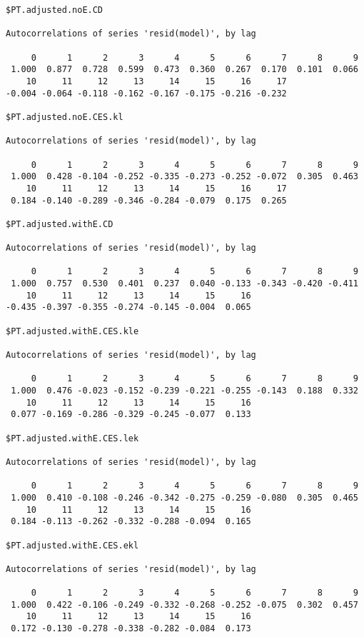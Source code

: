 \documentclass[preprint,authoryear,12pt]{elsarticle}\usepackage[]{graphicx}\usepackage[]{color}
\makeatletter
\newenvironment{kframe}{%
 \def\at@end@of@kframe{}%
 \ifinner\ifhmode%
  \def\at@end@of@kframe{\end{minipage}}%
  \begin{minipage}{\columnwidth}%
 \fi\fi%
 \def\FrameCommand##1{\hskip\@totalleftmargin \hskip-\fboxsep
 \colorbox{shadecolor}{##1}\hskip-\fboxsep
     \hskip-\linewidth \hskip-\@totalleftmargin \hskip\columnwidth}%
 \MakeFramed {\advance\hsize-\width
   \@totalleftmargin\z@ \linewidth\hsize
   \@setminipage}}%
 {\par\unskip\endMakeFramed%
 \at@end@of@kframe}
\newenvironment{knitrout}{}{} %
\makeatother
\begin{document}
\begin{knitrout}
\begin{kframe}
\begin{verbatim}
$PT.adjusted.noE.CD

Autocorrelations of series 'resid(model)', by lag

     0      1      2      3      4      5      6      7      8      9 
 1.000  0.877  0.728  0.599  0.473  0.360  0.267  0.170  0.101  0.066 
    10     11     12     13     14     15     16     17 
-0.004 -0.064 -0.118 -0.162 -0.167 -0.175 -0.216 -0.232 

$PT.adjusted.noE.CES.kl

Autocorrelations of series 'resid(model)', by lag

     0      1      2      3      4      5      6      7      8      9 
 1.000  0.428 -0.104 -0.252 -0.335 -0.273 -0.252 -0.072  0.305  0.463 
    10     11     12     13     14     15     16     17 
 0.184 -0.140 -0.289 -0.346 -0.284 -0.079  0.175  0.265 

$PT.adjusted.withE.CD

Autocorrelations of series 'resid(model)', by lag

     0      1      2      3      4      5      6      7      8      9 
 1.000  0.757  0.530  0.401  0.237  0.040 -0.133 -0.343 -0.420 -0.411 
    10     11     12     13     14     15     16 
-0.435 -0.397 -0.355 -0.274 -0.145 -0.004  0.065 

$PT.adjusted.withE.CES.kle

Autocorrelations of series 'resid(model)', by lag

     0      1      2      3      4      5      6      7      8      9 
 1.000  0.476 -0.023 -0.152 -0.239 -0.221 -0.255 -0.143  0.188  0.332 
    10     11     12     13     14     15     16 
 0.077 -0.169 -0.286 -0.329 -0.245 -0.077  0.133 

$PT.adjusted.withE.CES.lek

Autocorrelations of series 'resid(model)', by lag

     0      1      2      3      4      5      6      7      8      9 
 1.000  0.410 -0.108 -0.246 -0.342 -0.275 -0.259 -0.080  0.305  0.465 
    10     11     12     13     14     15     16 
 0.184 -0.113 -0.262 -0.332 -0.288 -0.094  0.165 

$PT.adjusted.withE.CES.ekl

Autocorrelations of series 'resid(model)', by lag

     0      1      2      3      4      5      6      7      8      9 
 1.000  0.422 -0.106 -0.249 -0.332 -0.268 -0.252 -0.075  0.302  0.457 
    10     11     12     13     14     15     16 
 0.172 -0.130 -0.278 -0.338 -0.282 -0.084  0.173 


\end{verbatim}
\end{kframe}
\end{knitrout}
\end{document}
